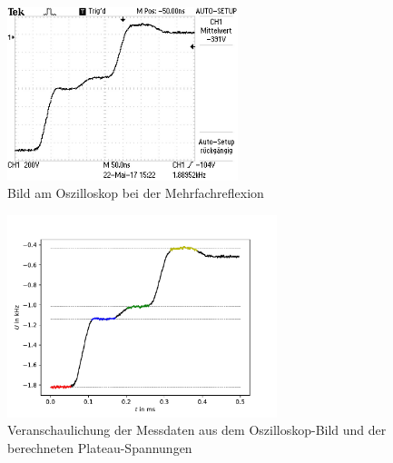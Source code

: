 \begin{figure}[h]
	\centering
	\includegraphics[width=0.6\textwidth]{Oszilloskop/Mehrfachreflexion/F0054TEK.JPG}
	\caption[Mehrfachreflexion]{Bild am Oszilloskop bei der Mehrfachreflexion}
	\label{fig:Mehrfachreflexion}
\end{figure}
\begin{figure}[h]
	\centering
	\includegraphics[width=0.7\textwidth]{Plot.pdf}
	\caption{Veranschaulichung der Messdaten aus dem Oszilloskop-Bild und der berechneten Plateau-Spannungen}
	\label{fig:U}
\end{figure}
